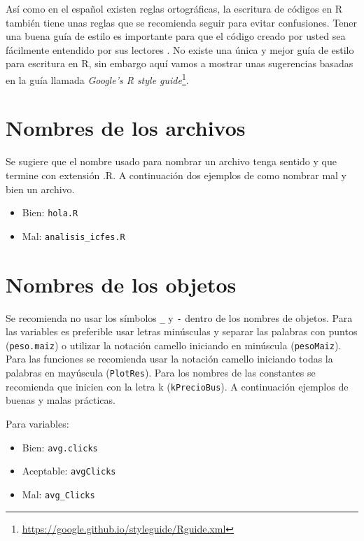\documentclass[10pt,]{krantz}
\providecommand{\tightlist}{%
  \setlength{\itemsep}{0pt}\setlength{\parskip}{0pt}}
\let\proglang=\textsf
\renewcommand{\href}[2]{#2\footnote{\url{#1}}}
\begin{document}
Así como en el español existen reglas ortográficas, la escritura de
códigos en \proglang{R} también tiene unas reglas que se recomienda
seguir para evitar confusiones. Tener una buena guía de estilo
 es importante para que el código creado por usted
sea fácilmente entendido por sus lectores \citet{rpackages}. No existe
una única y mejor guía de estilo para escritura en \proglang{R}, sin
embargo aquí vamos a mostrar unas sugerencias basadas en la guía llamada
\href{https://google.github.io/styleguide/Rguide.xml}{\textit{Google's R style guide}}.

\section{Nombres de los archivos}\label{nombres-de-los-archivos}

Se sugiere que el nombre usado para nombrar un archivo tenga sentido y
que termine con extensión .R. A continuación dos ejemplos de como
nombrar mal y bien un archivo.

\begin{itemize}
\tightlist
\item
  Bien: \texttt{hola.R}
\item
  Mal: \texttt{analisis\_icfes.R}
\end{itemize}

\section{Nombres de los objetos}\label{nombres-de-los-objetos}

Se recomienda no usar los símbolos \texttt{\_} y \texttt{-} dentro de
los nombres de objetos. Para las variables es preferible usar letras
minúsculas y separar las palabras con puntos (\texttt{peso.maiz}) o
utilizar la notación camello iniciando en minúscula (\texttt{pesoMaiz}).
Para las funciones se recomienda usar la notación camello iniciando
todas la palabras en mayúscula (\texttt{PlotRes}). Para los nombres de
las constantes se recomienda que inicien con la letra k
(\texttt{kPrecioBus}). A continuación ejemplos de buenas y malas
prácticas.

Para variables:

\begin{itemize}
    \item Bien: \verb|avg.clicks|
    \item Aceptable: \verb|avgClicks|
    \item Mal: \verb|avg_Clicks|
\end{itemize}
\end{document}
